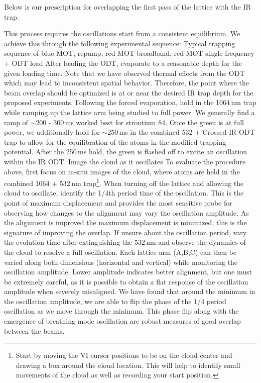 Below is our prescription for overlapping the first pass of the lattice with the IR trap.
\begin{outline}[enumerate]
\1 This process requires the oscillations start from a consistent equilibrium.
We achieve this through the following experimental sequence:
	\2 Typical trapping sequence of blue MOT, repump, red MOT broadband, red MOT single frequency + ODT load
	\2 After loading the ODT, evaporate to a reasonable depth for the given loading time.
	Note that we have observed thermal effects from the ODT which may lead to inconsistent spatial behavior.
	Therefore, the point where the beam overlap should be optimized is at or near the desired IR trap depth for the proposed experiments.
	\2 Following the forced evaporation, hold in the 1064\,nm trap while ramping up the lattice arm being studied to full power.
	We generally find a ramp of $\sim$200 - 300\,ms worked best for strontium 84. 
	\2 Once the green is at full power, we additionally hold for $\sim$250\,ms in the combined 532 + Crossed IR ODT trap to allow for the equilibration of the atoms in the modified trapping potential.
	\2 After the 250\,ms hold, the green is flashed off to excite an oscillation within the IR ODT.
	\2 Image the cloud as it oscillates
\1 To evaluate the procedure above, first focus on in-situ images of the cloud, where atoms are held in the combined 1064 + 532\,nm trap\footnote{
Start by moving the VI cursor positions to be on the cloud center and drawing a box around the cloud location.
This will help to identify small movements of the cloud as well as recording your start position.}.  
\1 When turning off the lattice and allowing the cloud to oscillate, identify the 1/4th period time of the oscillation. 
This is the point of maximum displacement and provides the most sensitive probe for observing how changes to the alignment may vary the oscillation amplitude.
As the alignment is improved the maximum displacement is minimized, this is the signature of improving the overlap.
If unsure about the oscillation period, vary the evolution time after extinguishing the 532\,nm and observe the dynamics of the cloud to resolve a full oscillation.
\1 Each lattice arm (A,B,C) can then be varied along both dimensions (horizontal and vertical) while monitoring the oscillation amplitude. 
Lower amplitude indicates better alignment, but one must be extremely careful, as it is possible to obtain a flat response of the oscillation amplitude when severely misaligned.
We have found that around the minimum in the oscillation amplitude, we are able to flip the phase of the 1/4 period oscillation as we move through the minimum.
This phase flip along with the emergence of breathing mode oscillation are robust measures of good overlap between the beams.
\end{outline}

